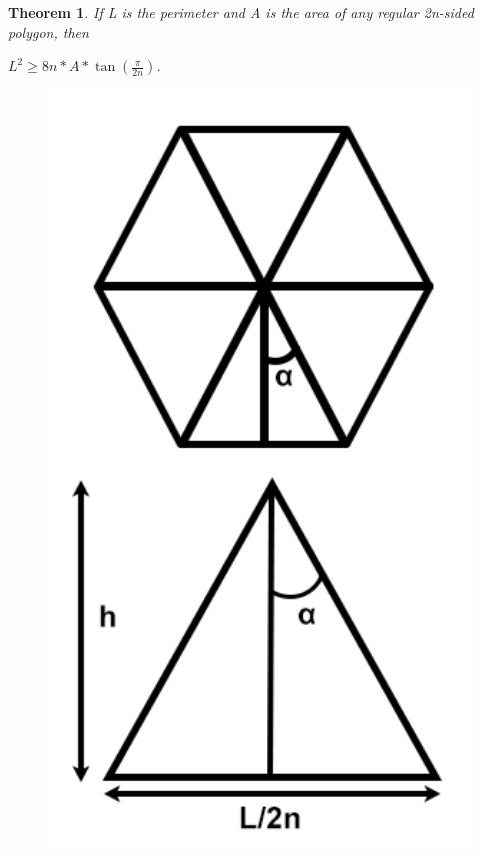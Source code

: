 \documentclass[a4paper]{book}
\newtheorem{theorem}{Theorem}%
\numberwithin{theorem}{section}%
\begin{document}
\begin{theorem}
    If L is the perimeter and A is the area of any regular 2n-sided polygon, then 
    \begin{center}
        $L^{2}\geq8n*A*\tan{(\frac{\pi}{2n})}$.
    \end{center}
\end{theorem}

\begin{figure} [h]
    \centering
    \begin{minipage}{0.5\textwidth}
        \centering
        \includegraphics[width=1\textwidth]{isofig8.png} %
        \caption{}
    \end{minipage}\hfill
    \begin{minipage}{0.5\textwidth}
        \centering
        \includegraphics[width=1\textwidth]{isofig9.png} %
        \caption{}
    \end{minipage}
\end{figure}
\end{document}
